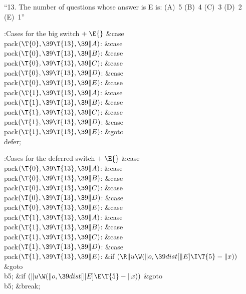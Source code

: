 ``13. The number of questions whose answer is E is:
(A)~5 (B)~4 (C)~3 (D)~2 (E)~1''

\Y\B\4:Cases for the big switch\X${}\mathrel+\E{}$\6
\4\&{case} \\{pack}${}(\T{0},\39\T{13},\39\|A){}$:\5
\&{case} \\{pack}${}(\T{0},\39\T{13},\39\|B){}$:\5
\&{case} \\{pack}${}(\T{0},\39\T{13},\39\|C){}$:\5
\&{case} \\{pack}${}(\T{0},\39\T{13},\39\|D){}$:\5
\&{case} \\{pack}${}(\T{0},\39\T{13},\39\|E){}$:\5
\&{case} \\{pack}${}(\T{1},\39\T{13},\39\|A){}$:\5
\&{case} \\{pack}${}(\T{1},\39\T{13},\39\|B){}$:\5
\&{case} \\{pack}${}(\T{1},\39\T{13},\39\|C){}$:\5
\&{case} \\{pack}${}(\T{1},\39\T{13},\39\|D){}$:\5
\&{case} \\{pack}${}(\T{1},\39\T{13},\39\|E){}$:\5
\&{goto} \\{defer};\par
\fi

\B{}:Cases for the deferred switch\X${}\mathrel+\E{}$\6
\4\&{case} \\{pack}${}(\T{0},\39\T{13},\39\|A){}$:\5
\&{case} \\{pack}${}(\T{0},\39\T{13},\39\|B){}$:\5
\&{case} \\{pack}${}(\T{0},\39\T{13},\39\|C){}$:\5
\&{case} \\{pack}${}(\T{0},\39\T{13},\39\|D){}$:\5
\&{case} \\{pack}${}(\T{0},\39\T{13},\39\|E){}$:\5
\&{case} \\{pack}${}(\T{1},\39\T{13},\39\|A){}$:\5
\&{case} \\{pack}${}(\T{1},\39\T{13},\39\|B){}$:\5
\&{case} \\{pack}${}(\T{1},\39\T{13},\39\|C){}$:\5
\&{case} \\{pack}${}(\T{1},\39\T{13},\39\|D){}$:\5
\&{case} \\{pack}${}(\T{1},\39\T{13},\39\|E){}$:\6
\&{if} ${}(\R\|u\W(\|o,\39\\{dist}[\|E]\I\T{5}-\|x)){}$\1\5
\&{goto} \\{b5};\2\6
\&{if} ${}(\|u\W(\|o,\39\\{dist}[\|E]\E\T{5}-\|x)){}$\1\5
\&{goto} \\{b5};\5
\2\&{break};\par
\fi

